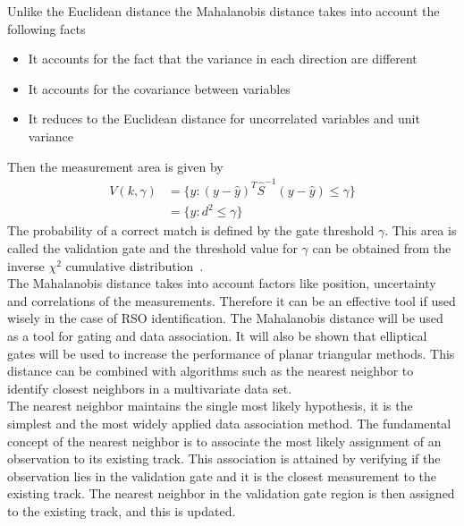 \documentclass[]{aiaa-tc}%
\begin{document}
Unlike the Euclidean distance the Mahalanobis distance takes into account the following facts \cite{giorgio_grisetti_robotics}
\begin{itemize}

\item It accounts for the fact that the variance in each direction are different

\item It accounts for the covariance between variables

\item It reduces to the Euclidean distance for uncorrelated variables and unit variance
\end{itemize}
Then the measurement area is given by
\begin{align*}
V(k,\gamma) &=  \lbrace y: (y-\hat{y})^T\hat{S}^{-1}(y - \hat{y}) \leq \gamma\rbrace \\
&=\lbrace y : d^2 \leq \gamma \rbrace
\end{align*}
The probability of a correct match is defined by the gate threshold $\gamma$. This area is called the validation gate and the threshold value for $\gamma$ can be obtained from the inverse $\chi^2$ cumulative distribution~\cite{giorgio_grisetti_robotics}.\\

The Mahalanobis  distance takes into account factors like position, uncertainty and correlations of the measurements. Therefore it can be an effective tool if used wisely in the case of RSO identification. The Mahalanobis distance will be used as a tool for gating and data association. It will also be shown that elliptical gates will be used to increase the performance of planar triangular methods. This distance can be combined with algorithms such as the nearest neighbor to identify closest neighbors in a multivariate data set.\\

The nearest neighbor maintains the single most likely hypothesis, it is the simplest and the most widely applied data association method. The fundamental concept of the nearest neighbor is to associate the most likely assignment of an observation to its existing track. This association is attained by verifying if the observation lies in the validation gate and it is the closest measurement to the existing track. The nearest neighbor in the validation gate region is then assigned to the existing track, and this is updated.\\
\end{document}
